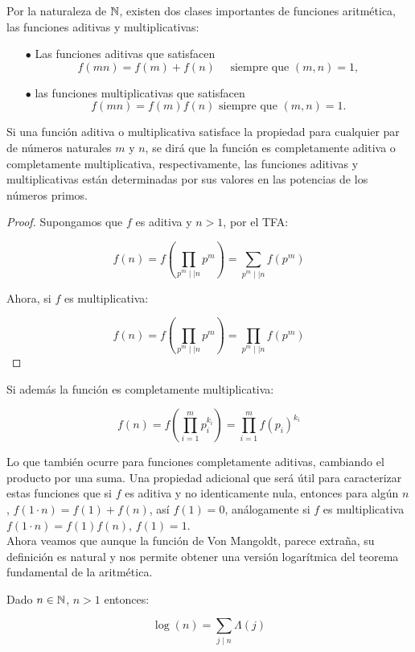 Por la naturaleza de $\mathbb{N}$, existen dos clases importantes de funciones aritmética, las funciones aditivas y multiplicativas:

\begin{itemize}

\item[$\bullet$] Las funciones aditivas que satisfacen
$$
f(m n)=f(m)+f(n) \quad \text { siempre que }(m, n)=1,
$$


\item[$\bullet$] las funciones multiplicativas que satisfacen
$$
f(m n)=f(m) f(n) \text { siempre que }(m, n)=1 .
$$


\end{itemize}


Si una función aditiva o multiplicativa satisface la  propiedad para cualquier par de números naturales $m$ y $n$, se dirá que la función es completamente aditiva o completamente multiplicativa, respectivamente, las funciones aditivas y multiplicativas están determinadas por sus valores en las potencias de los números primos.\\ 

\begin{proof}
Supongamos que $f$ es aditiva y $n>1$, por el TFA:

$$f(n)=f\left(\prod_{p^m\mid\mid n}p^m\right)=\sum_{p^m\mid \mid n} f(p^{m})$$

Ahora, si $f$ es multiplicativa:

$$f(n)=f\left(\prod_{p^m\mid\mid n}p^m\right)=\prod_{p^m\mid\mid n}f(p^m) $$
\end{proof}

Si además la función es completamente multiplicativa:

$$f(n)=f\left(\prod_{i=1}^{m}p_i^{k_i}\right)=\prod_{i=1}^{m} f(p_i)^{k_i} $$

Lo que también ocurre para funciones completamente aditivas, cambiando el producto por una suma.  Una propiedad adicional que será útil para caracterizar estas funciones que si $f$ es aditiva y no identicamente nula, entonces para algún $n$, $f(1\cdot  n)=f(1)+f(n)$, así $f(1)=0$, análogamente si $f$ es multiplicativa $f(1\cdot n)=f(1)f(n)$, $f(1)=1$.\\

Ahora veamos que aunque la función de Von Mangoldt, parece extraña, su definición es natural y nos permite obtener una versión logarítmica del teorema fundamental de la aritmética.
\begin{theorem}
Dado $n\in \mathbb{N}$, $n>1$ entonces:

$$\log(n)=\sum_{j\mid n}\Lambda(j)$$
\end{theorem}

